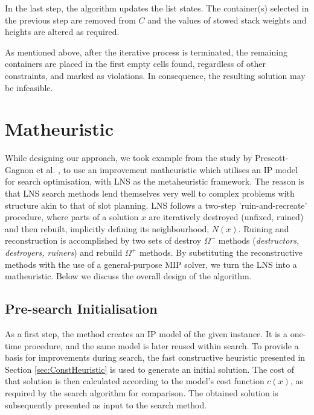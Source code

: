 \documentclass[preprint,11pt,3p]{elsarticle}
\begin{document}
In the last step, the algorithm updates the list states. The container(s) selected in the previous step are removed from $C$  and the values of stowed stack weights and heights are altered as required. 

As mentioned above, after the iterative process is terminated, the remaining containers are placed in the first empty cells found, regardless of other constraints, and marked as violations. In consequence, the resulting solution may be infeasible.

\section{Matheuristic}
\label{sec:Matheuristic}
While designing our approach, we took example from the study by Prescott-Gagnon et al. \cite{PGDR-Math}, to use an improvement matheuristic which utilises an IP model for search optimisation, with LNS \cite{PR-LNS} as the metaheuristic framework. The reason is that LNS search methods lend themselves very well to complex problems with structure akin to that of slot planning. LNS follows a two-step 'ruin-and-recreate' procedure, where parts of a solution $x$ are iteratively destroyed (unfixed, ruined) and then rebuilt, implicitly defining its neighbourhood, $N(x)$. Ruining and reconstruction is accomplished by two sets of destroy $\Omega^{-}$ methods (\textit{destructors, destroyers, ruiners}) and rebuild $\Omega^{+}$ methods. By substituting the reconstructive methods with the use of a general-purpose MIP solver, we turn the LNS into a matheuristic. Below we discuss the overall design of the algorithm.

\subsection{Pre-search Initialisation}
As a first step, the method creates an IP model of the given instance. It is a one-time procedure, and the same model is later reused within search. To provide a basis for improvements during search, the fast constructive heuristic presented in Section \ref{sec:ConstHeuristic} is used to generate an initial solution. The cost of that solution is then calculated according to the model's cost function $c(x)$, as required by the search algorithm for comparison. The obtained solution is subsequently presented as input to the search method. 
\end{document}
